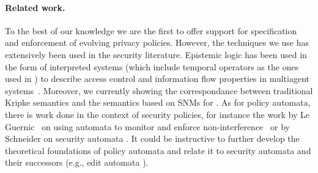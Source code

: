 \paragraph{Related work.} To the best of our knowledge we are the first to offer support for specification and enforcement of evolving privacy policies. However, the techniques we use has extensively been used in the security literature. Epistemic logic has been used in the form of interpreted systems (which include temporal operators as the ones used in \tfppf) to describe access control and information flow properties in multiagent systems~\cite{FHM+95rk,HK08sms,B13lifadp,RT11lkfsn}. Moreover, we currently showing the correspondance between traditional Kripke semantics and the semantics based on SNMs for \tfppf. As for policy automata, there is work done in the context of security policies, for instance the work by Le Guernic \etal~on using automata to monitor and enforce non-interference~\cite{LeGuernic2007,LeGuernic07acmcp} or by Schneider on security automata \cite{Schneider00esp}. It could be instructive to further develop the theoretical foundations of policy automata and relate it to security automata and their successors (e.g., edit automata \cite{LBW05ea}).
